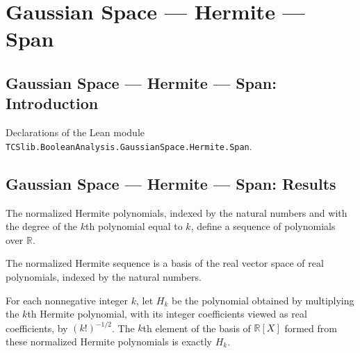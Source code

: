 \section{Gaussian Space --- Hermite --- Span}
\subsection*{Gaussian Space --- Hermite --- Span: Introduction}

Declarations of the Lean module \texttt{TCSlib.BooleanAnalysis.GaussianSpace.Hermite.Span}.

\subsection*{Gaussian Space --- Hermite --- Span: Results}

\begin{definition}
\label{BooleanAnalysis.GaussianSpace.normalizedHermiteSequence}
\leanok
{}
The normalized Hermite polynomials, indexed by the natural numbers and with the degree
of the $k$th polynomial equal to $k$, define a sequence of polynomials over $\mathbb R$.
\end{definition}

\begin{definition}
\label{BooleanAnalysis.GaussianSpace.normalizedHermiteBasis}
\leanok
{}
The normalized Hermite sequence is a basis of the real vector space of real polynomials,
indexed by the natural numbers.
\end{definition}

\begin{theorem}
\label{BooleanAnalysis.GaussianSpace.normalizedHermiteBasis_apply}
\leanok
{}
For each nonnegative integer $k$, let $H_k$ be the polynomial obtained by multiplying
the $k$th Hermite polynomial, with its integer coefficients viewed as real coefficients,
by $(k!)^{-1/2}$. The $k$th element of the basis of $\mathbb R[X]$ formed from these
normalized Hermite polynomials is exactly $H_k$.
\end{theorem}

